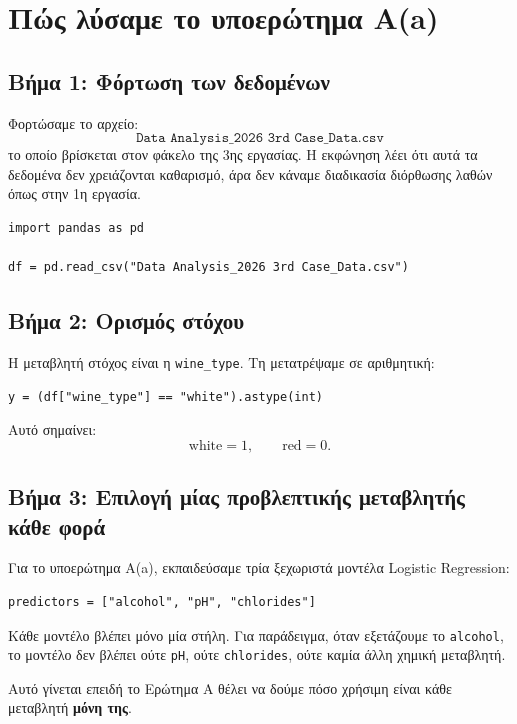 \documentclass[11pt,a4paper]{article}
\newcommand{\code}[1]{\texttt{#1}}
\begin{document}
\section{Πώς λύσαμε το υποερώτημα Α(a)}

\subsection{Βήμα 1: Φόρτωση των δεδομένων}

Φορτώσαμε το αρχείο:
\[
\code{Data Analysis\_2026 3rd Case\_Data.csv}
\]
το οποίο βρίσκεται στον φάκελο της 3ης εργασίας. Η εκφώνηση λέει ότι αυτά
τα δεδομένα δεν χρειάζονται καθαρισμό, άρα δεν κάναμε διαδικασία διόρθωσης
λαθών όπως στην 1η εργασία.

\begin{lstlisting}
import pandas as pd

df = pd.read_csv("Data Analysis_2026 3rd Case_Data.csv")
\end{lstlisting}

\subsection{Βήμα 2: Ορισμός στόχου}

Η μεταβλητή στόχος είναι η \code{wine\_type}. Τη μετατρέψαμε σε αριθμητική:

\begin{lstlisting}
y = (df["wine_type"] == "white").astype(int)
\end{lstlisting}

Αυτό σημαίνει:
\[
\text{white} = 1, \qquad \text{red} = 0.
\]

\subsection{Βήμα 3: Επιλογή μίας προβλεπτικής μεταβλητής κάθε φορά}

Για το υποερώτημα Α(a), εκπαιδεύσαμε τρία ξεχωριστά μοντέλα Logistic
Regression:

\begin{lstlisting}
predictors = ["alcohol", "pH", "chlorides"]
\end{lstlisting}

Κάθε μοντέλο βλέπει μόνο μία στήλη. Για παράδειγμα, όταν εξετάζουμε το
\code{alcohol}, το μοντέλο δεν βλέπει ούτε \code{pH}, ούτε \code{chlorides},
ούτε καμία άλλη χημική μεταβλητή.

Αυτό γίνεται επειδή το Ερώτημα Α θέλει να δούμε πόσο χρήσιμη είναι κάθε
μεταβλητή \textbf{μόνη της}.
\end{document}
